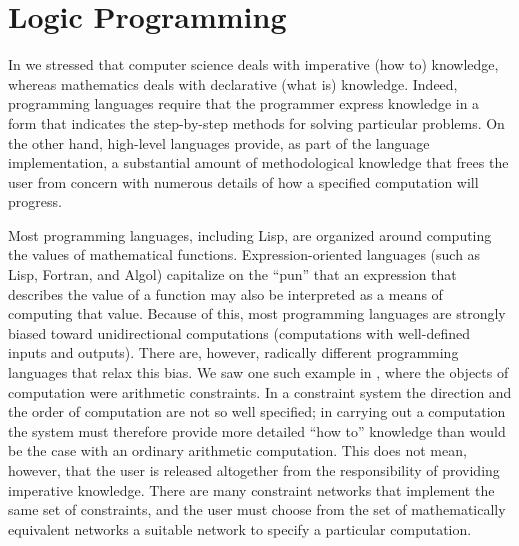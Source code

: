 \section{Logic Programming}
\label{Section 4.4}

In  we stressed that computer science deals with imperative (how
to) knowledge, whereas mathematics deals with declarative (what is) knowledge.
Indeed, programming languages require that the programmer express knowledge in
a form that indicates the step-by-step methods for solving particular problems.
On the other hand, high-level languages provide, as part of the language
implementation, a substantial amount of methodological knowledge that frees the
user from concern with numerous details of how a specified computation will
progress.

Most programming languages, including Lisp, are organized around computing the
values of mathematical functions.  Expression-oriented languages (such as Lisp,
Fortran, and Algol) capitalize on the ``pun'' that an expression that describes
the value of a function may also be interpreted as a means of computing that
value.  Because of this, most programming languages are strongly biased toward
unidirectional computations (computations with well-defined inputs and
outputs).  There are, however, radically different programming languages that
relax this bias.  We saw one such example in , where the
objects of computation were arithmetic constraints.  In a constraint system the
direction and the order of computation are not so well specified; in carrying
out a computation the system must therefore provide more detailed ``how to''
knowledge than would be the case with an ordinary arithmetic computation.  This
does not mean, however, that the user is released altogether from the
responsibility of providing imperative knowledge.  There are many constraint
networks that implement the same set of constraints, and the user must choose
from the set of mathematically equivalent networks a suitable network to
specify a particular computation.

